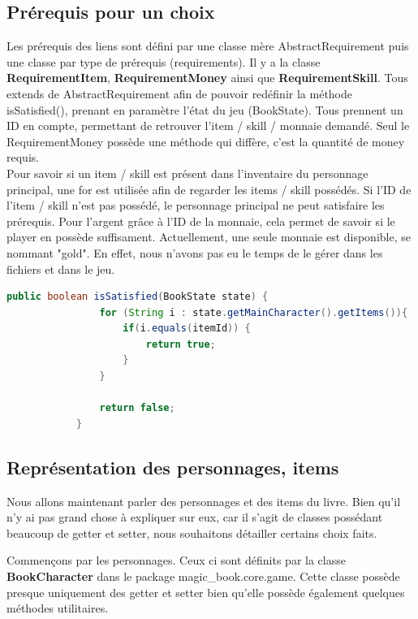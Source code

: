		\subsection{Prérequis pour un choix}
			Les prérequis des liens sont défini par une classe mère AbstractRequirement puis une classe par type de prérequis (requirements). Il y a la classe \textbf{RequirementItem}, \textbf{RequirementMoney} ainsi que \textbf{RequirementSkill}. Tous extends de AbstractRequirement afin de pouvoir redéfinir la méthode isSatisfied(), prenant en paramètre l'état du jeu (BookState). Tous prennent un ID en compte, permettant de retrouver l'item / skill / monnaie demandé. Seul le RequirementMoney possède une méthode qui diffère, c'est la quantité de money requis.\\
			Pour savoir si un item / skill est présent dans l'inventaire du personnage principal, une for est utilisée afin de regarder les items / skill possédés. Si l'ID de l'item / skill n'est pas possédé, le personnage principal ne peut satisfaire les prérequis. Pour l'argent grâce à l'ID de la monnaie, cela permet de savoir si le player en possède suffisament. Actuellement, une seule monnaie est disponible, se nommant "gold". En effet, nous n'avons pas eu le temps de le gérer dans les fichiers et dans le jeu.

			\begin{lstlisting}[gobble=12, language=java, caption=exemple de isSatisfied(), label=isSatisfied]
			public boolean isSatisfied(BookState state) {
				for (String i : state.getMainCharacter().getItems()){
					if(i.equals(itemId)) {
						return true;
					}
				}

				return false;
			}
			\end{lstlisting}


		\subsection{Représentation des personnages, items}

			Nous allons maintenant parler des personnages et des items du livre. Bien qu'il n'y ai pas grand chose à expliquer sur eux, car il s'agit de classes possédant beaucoup de getter et setter, nous souhaitons détailler certains choix faits.

			Commençons par les personnages. Ceux ci sont définits par la classe \textbf{BookCharacter} dans le package magic\_book.core.game. Cette classe possède presque uniquement des getter et setter bien qu'elle possède également quelques méthodes utilitaires.

